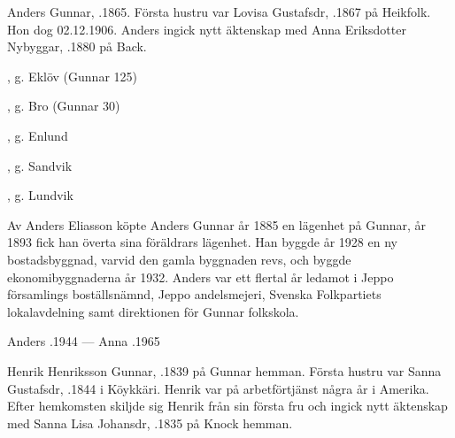 Anders Gunnar, .1865. Första hustru var Lovisa Gustafsdr, .1867 på Heikfolk. Hon dog 02.12.1906. Anders ingick nytt äktenskap med Anna Eriksdotter Nybyggar, .1880 på Back.
\begin{jhchildren}
  \item {}
  \item {}
  \item {}, g. Eklöv (Gunnar 125)
  \item {}, g. Bro (Gunnar 30)
  \item {}, g. Enlund
  \item {}
  \item {}, g. Sandvik
  \item {}, g. Lundvik
  \item {}
  \item {}
  \item {}
\end{jhchildren}

Av Anders Eliasson köpte Anders Gunnar år 1885 en lägenhet på Gunnar, år 1893 fick han överta sina föräldrars lägenhet. Han byggde år 1928 en ny bostadsbyggnad, varvid den gamla byggnaden revs, och byggde ekonomibyggnaderna år 1932.	Anders var ett flertal år ledamot i Jeppo församlings boställsnämnd, Jeppo andelsmejeri, Svenska Folkpartiets lokalavdelning samt direktionen för Gunnar folkskola.

Anders .1944  ---  Anna .1965


Henrik Henriksson Gunnar, .1839 på Gunnar hemman. Första hustru var Sanna Gustafsdr, .1844 i Köykkäri. Henrik var på arbetförtjänst några år i Amerika. Efter hemkomsten skiljde sig Henrik från sin första fru och ingick nytt äktenskap med Sanna Lisa Johansdr, .1835 på Knock hemman.
\begin{jhchildren}
  \item {}
  \item {}
  \item {}
  \item {}
  \item {}
\end{jhchildren}

